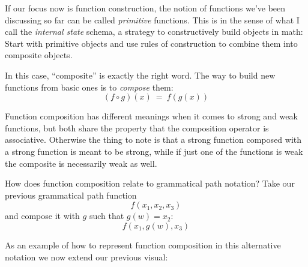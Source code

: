 \documentclass[twoside]{article}
\begin{document}
If our focus now is function construction, the notion of functions we've been discussing so far can be called
\emph{primitive} functions. This is in the sense of what I call the \emph{internal state} schema, a strategy
to constructively build objects in math: Start with primitive objects and use rules of construction to combine
them into composite objects.

In this case, ``composite'' is exactly the right word. The way to build new functions from basic ones is
to \emph{compose} them:
$$ (f\circ g)(x)\ =\ f(g(x)) $$

Function composition has different meanings when it comes to strong and weak functions, but both share
the property that the composition operator is associative. Otherwise the thing to note is that a strong
function composed with a strong function is meant to be strong, while if just one of the functions is
weak the composite is necessarily weak as well.

How does function composition relate to grammatical path notation? Take our previous grammatical path function
$$ f(x_1,x_2,x_3) $$
and compose it with $ g $ such that $ g(w)=x_2 $:
$$ f(x_1,g(w),x_3) $$

As an example of how to represent function composition in this alternative notation we now extend our previous visual:
\end{document}
